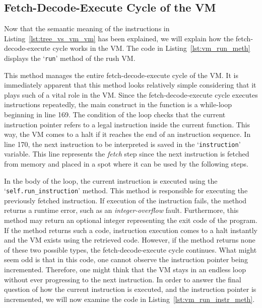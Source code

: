 \subsection{Fetch-Decode-Execute Cycle of the VM}
Now that the semantic meaning of the instructions in Listing~\ref{lst:tree_vs_vm_vm} has been explained, we will explain how the fetch-decode-execute cycle works in the VM\@.
The code in Listing~\ref{lst:vm_run_meth} displays the `\texttt{run}' method of the rush VM\@.


This method manages the entire fetch-decode-execute cycle of the VM\@.
It is immediately apparent that this method looks relatively simple considering that it plays such of a vital role in the VM\@.
Since the fetch-decode-execute cycle executes instructions repeatedly, the main construct in the function is a while-loop beginning in line 169.
The condition of the loop checks that the current instruction pointer refers to a legal instruction inside the current function.
This way, the VM comes to a halt if it reaches the end of an instruction sequence.
In line 170, the next instruction to be interpreted is saved in the `\texttt{instruction}' variable.
This line represents the \emph{fetch} step since the next instruction is fetched from memory and placed in a spot where it can be used by the following steps.

In the body of the loop, the current instruction is executed using the `\texttt{self.run\_instruction}' method.
This method is responsible for executing the previously fetched instruction.
If execution of the instruction fails, the method returns a runtime error, such as an \emph{integer-overflow} fault.
Furthermore, this method may return an optional integer representing the exit code of the program.
If the method returns such a code, instruction execution comes to a halt instantly and the VM exists using the retrieved code.
However, if the method returns none of these two possible types, the fetch-decode-execute cycle continues.
What might seem odd is that in this code, one cannot observe the instruction pointer being incremented.
Therefore, one might think that the VM stays in an endless loop without ever progressing to the next instruction.
In order to answer the final question of how the current instruction is executed, and the instruction pointer is incremented, we will now examine the code in Listing~\ref{lst:vm_run_instr_meth}.


